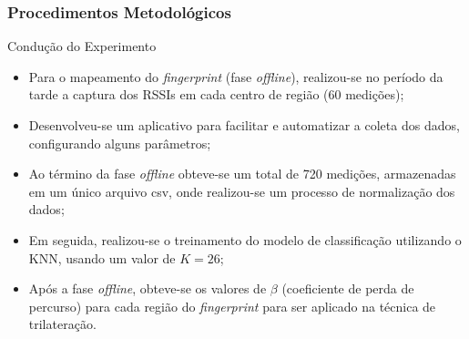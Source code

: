 \documentclass[xcolor={dvipsnames,svgnames,table}]{beamer}
\begin{document}
	\begin{frame}
		\frametitle{Procedimentos Metodológicos}	
		\begin{block}{Condução do Experimento}
			\begin{itemize}[label=\textcolor{black}{\textbullet}, left=5pt]
				\justifying
				\item Para o mapeamento do \textit{fingerprint} (fase \textit{offline}), realizou-se no período da tarde a captura dos RSSIs em cada centro de região (60 medições);
				\item Desenvolveu-se um aplicativo para facilitar e automatizar a coleta dos dados, configurando alguns parâmetros;%
				\item Ao término da fase \textit{offline} obteve-se um total de 720 medições, armazenadas em um único arquivo csv, onde realizou-se um processo de normalização dos dados;%
				\item Em seguida, realizou-se o treinamento do modelo de classificação utilizando o KNN, usando um valor de $K=26$;
				\item Após a fase \textit{offline}, obteve-se os valores de $\beta$ (coeficiente de perda de percurso) para cada região do \textit{fingerprint} para ser aplicado na técnica de trilateração.
			\end{itemize}
		\end{block}
	\end{frame}
\end{document}
